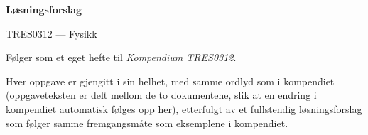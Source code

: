 \documentclass[A4,12pt,twoside]{book}
\begin{document}
\begin{titlepage}
\centering
\vspace*{3cm}
{\Huge\bfseries Løsningsforslag\par}
\vspace{0.5cm}
{\Large TRES0312 --- Fysikk\par}
\vspace{2cm}
{\large Følger som et eget hefte til \textit{Kompendium TRES0312}.\par}
\vspace{0.3cm}
{\normalsize Hver oppgave er gjengitt i sin helhet, med samme ordlyd som i kompendiet (oppgaveteksten er delt mellom de to dokumentene, slik at en endring i kompendiet automatisk følges opp her), etterfulgt av et fullstendig løsningsforslag som følger samme fremgangsmåte som eksemplene i kompendiet.\par}
\end{titlepage}
\restoregeometry

\tableofcontents










\end{document}
